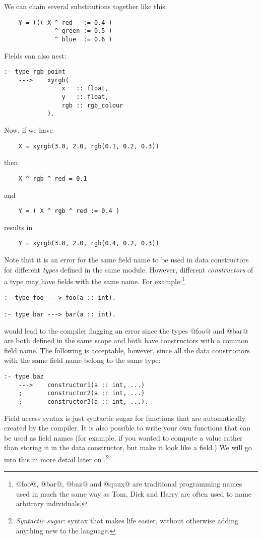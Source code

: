 We can chain several substitutions together like this:
\begin{verbatim}
    Y = ((( X ^ red   := 0.4 )
              ^ green := 0.5 )
              ^ blue  := 0.6 )
\end{verbatim}
Fields can also nest:
\begin{verbatim}
:- type rgb_point
    --->    xyrgb(
                x   :: float,
                y   :: float,
                rgb :: rgb_colour
            ).
\end{verbatim}
Now, if we have
\begin{verbatim}
    X = xyrgb(3.0, 2.0, rgb(0.1, 0.2, 0.3))
\end{verbatim}
then
\begin{verbatim}
    X ^ rgb ^ red = 0.1
\end{verbatim}
and
\begin{verbatim}
    Y = ( X ^ rgb ^ red := 0.4 )
\end{verbatim}
results in
\begin{verbatim}
    Y = xyrgb(3.0, 2.0, rgb(0.4, 0.2, 0.3))
\end{verbatim}
Note that it is an error for the same field name to be used in
data constructors for different \emph{types} defined in the same
module.  However, different \emph{constructors} of a type may have
fields with the same name.  For example:\footnote{@foo@, @bar@, @baz@ and @quux@ are traditional programming
names used in much the same way as Tom, Dick and Harry are often
used to name arbitrary individuals.}
\begin{verbatim}
:- type foo ---> foo(a :: int).

:- type bar ---> bar(a :: int).
\end{verbatim}
would lead to the compiler flagging an error since the types
@foo@ and @bar@ are both defined in the same scope and both have
constructors with a common field name.  The following is
acceptable, however, since all the data constructors with the
same field name belong to the same type:
\begin{verbatim}
:- type baz
    --->    constructor1(a :: int, ...)
    ;       constructor2(a :: int, ...)
    ;       constructor3(a :: int, ...).
\end{verbatim}
Field access syntax is just syntactic sugar for functions that
are automatically created by the compiler.  It is also
possible to write your own functions that can be used as field
names (for example, if you wanted to compute a value rather
than storing it in the data constructor, but make it look like
a field.)  We will go into this in more detail later on \XXX{}.\footnote{\emph{Syntactic sugar}: syntax that makes life easier,
without otherwise adding anything new to the language.}

